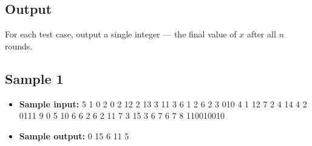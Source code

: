 \documentclass{article}
\begin{document}
\subsection*{Output}
 For each test case, output a single integer — the final value of $ x $ after all $ n $ rounds.

\subsection*{Sample 1}
\begin{itemize}
\item \textbf{Sample input:} 
5
1
0
2
0
2
12 2
13 3
11
3
6 1 2
6 2 3
010
4
1 12 7 2
4 14 4 2
0111
9
0 5 10 6 6 2 6 2 11
7 3 15 3 6 7 6 7 8
110010010
\item \textbf{Sample output:} 
0
15
6
11
5
\end{itemize}
\end{document}
